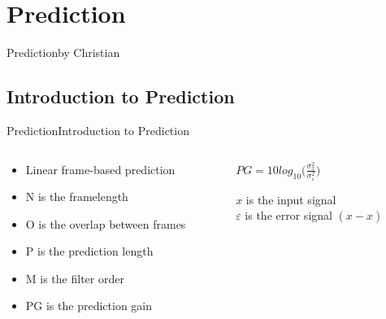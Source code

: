 \section{Prediction}
\begin{frame}{Prediction}{by Christian}
\end{frame}

\subsection{Introduction to Prediction}
\begin{frame}{Prediction}{Introduction to Prediction}
	\begin{columns}
		\begin{column}{0.5\textwidth}
			\begin{itemize}
				\item Linear frame-based prediction
				\item N is the framelength
				\item O is the overlap between frames
				\item P is the prediction length
				\item M is the filter order
				\item PG is the prediction gain
			\end{itemize}
		\end{column}
		\begin{column}{0.5\textwidth} 
			$PG = 10 log_{10}\bigg(\frac{\sigma^2_x}{\sigma^2_\varepsilon}\bigg)	$
			
			$x$ is the input signal\\
			$\varepsilon$ is the error signal $(x-\hat{x})$
		\end{column}
	\end{columns}
\end{frame}


